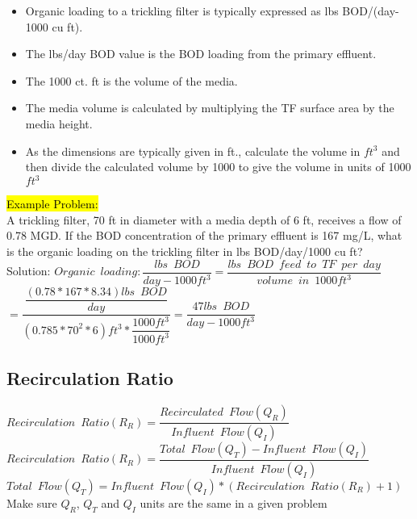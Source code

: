 			\begin{itemize}
\item Organic loading to a trickling filter is typically expressed as lbs BOD/(day-1000 cu ft).  \item The lbs/day BOD value is the BOD loading from the primary effluent.
\item The 1000 ct. ft is the volume of the media.  
\item The media volume is calculated by multiplying the TF surface area by the media height.  
\item As the dimensions are typically given in ft., calculate the volume in $ft^3$ and then divide the calculated volume by 1000 to give the volume in units of 1000$ft^3$\\
\end{itemize}
\hl{Example Problem:}\\
A trickling filter, 70 ft in diameter with a media depth of 6 ft, receives a flow of 0.78 MGD. If the BOD concentration of the primary effluent is 167 mg/L, what is the organic loading on the trickling filter in lbs BOD/day/1000 cu ft?\\
Solution:  $Organic \enspace loading:\dfrac{lbs \enspace BOD}{day-1000ft^3}=\dfrac{lbs \enspace BOD \enspace feed \enspace to \enspace TF \enspace per \enspace day}{volume \enspace in \enspace 1000ft^3}$\\
$=\dfrac{\dfrac{(0.78*167*8.34)lbs \enspace BOD}{day}}{(0.785*70^2*6)ft^3*\dfrac{1000ft^3}{1000ft^3}}=\boxed{\dfrac{47 lbs \enspace BOD}{day-1000 ft^3}}$

\subsection{Recirculation Ratio}


$Recirculation \enspace Ratio (R_R)=\dfrac{Recirculated \enspace Flow (Q_R)}{Influent  \enspace  Flow (Q_I)}$\\
\vspace{0.5cm}
$Recirculation \enspace Ratio (R_R)=\dfrac{Total \enspace Flow (Q_T) - Influent \enspace Flow (Q_I)}{Influent  \enspace  Flow (Q_I)}$\\
\vspace{0.5cm}
$Total \enspace Flow (Q_T) = Influent \enspace Flow (Q_I)*(Recirculation \enspace Ratio(R_R) +1)$
Make sure $Q_R$, $Q_T$ and $Q_I$ units are the same in a given problem

